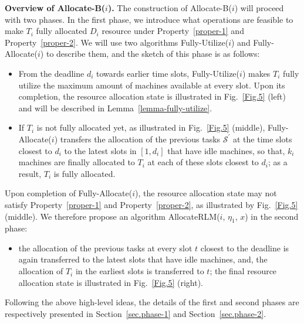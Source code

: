 \documentclass[10pt,journal,compsoc]{IEEEtran}
\begin{document}
\vspace{0.05em}\noindent\textbf{Overview of Allocate-B($i$).} The construction of Allocate-B($i$) will proceed with two phases. In the first phase, we introduce what operations are feasible to make $T_{i}$ fully allocated $D_{i}$ resource under Property~\ref{proper-1} and Property~\ref{proper-2}. We will use two algorithms Fully-Utilize($i$) and Fully-Allocate($i$) to describe them, and the sketch of this phase is as follows:
\begin{itemize}
 \setlength\itemsep{0.2em}

\item From the deadline $d_{i}$ towards earlier time slots, Fully-Utilize($i$) makes $T_{i}$ fully utilize the maximum amount of machines available at every slot. Upon its completion, the resource allocation state is illustrated in Fig.~\ref{Fig.5} (left) and will be described in Lemma~\ref{lemma-fully-utilize}.

\item If $T_{i}$ is not fully allocated yet, as illustrated in Fig.~\ref{Fig.5} (middle), Fully-Allocate($i$) transfers the allocation of the previous tasks $\mathcal{S}^{\prime}$ at the time slots closest to $d_{i}$ to the latest slots in $[1, d_{i}]$ that have idle machines, so that, $k_{i}$ machines are finally allocated to $T_{i}$ at each of these slots closest to $d_{i}$; as a result, $T_{i}$ is fully allocated.


\end{itemize}
Upon completion of Fully-Allocate($i$), the resource allocation state may not satisfy Property~\ref{proper-1} and Property~\ref{proper-2}, as illustrated by Fig.~\ref{Fig.5} (middle). We therefore propose an algorithm AllocateRLM($i$, $\eta_{1}$, $x$) in the second phase:
\begin{itemize}
\item the allocation of the previous tasks at every slot $t$ closest to the deadline is again transferred to the latest slots that have idle machines, and, the allocation of $T_{i}$ in the earliest slots is transferred to $t$; the final resource allocation state is illustrated in Fig.~\ref{Fig.5} (right).
\end{itemize}


Following the above high-level ideas, the details of the first and second phases are respectively presented in Section~\ref{sec.phase-1} and Section~\ref{sec.phase-2}.
\end{document}
